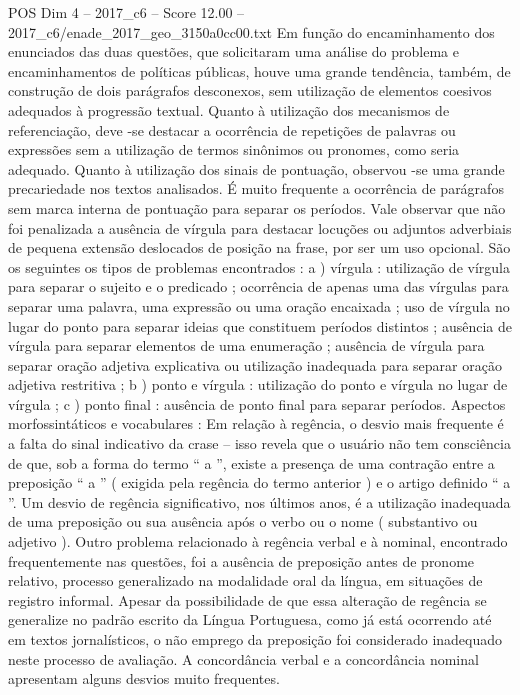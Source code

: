 \begin{textsample}{POS Dim 4 – 2017\_c6 – Score 12.00 – 2017\_c6/enade\_2017\_geo\_3150a0cc00.txt}
Em função do encaminhamento dos enunciados das duas questões, que solicitaram uma análise do problema e encaminhamentos de políticas públicas, houve uma grande tendência, também, de construção de dois parágrafos desconexos, sem utilização de elementos coesivos adequados à progressão textual.
Quanto à utilização dos mecanismos de referenciação, deve -se destacar a ocorrência de repetições de palavras ou expressões sem a utilização de termos sinônimos ou pronomes, como seria adequado.
Quanto à utilização dos sinais de pontuação, observou -se uma grande precariedade nos textos analisados.
É muito frequente a ocorrência de parágrafos sem marca interna de pontuação para separar os períodos.
Vale observar que não foi penalizada a ausência de vírgula para destacar locuções ou adjuntos adverbiais de pequena extensão deslocados de posição na frase, por ser um uso opcional.
São os seguintes os tipos de problemas encontrados : a ) vírgula : utilização de vírgula para separar o sujeito e o predicado ; ocorrência de apenas uma das vírgulas para separar uma palavra, uma expressão ou uma oração encaixada ; uso de vírgula no lugar do ponto para separar ideias que constituem períodos distintos ; ausência de vírgula para separar elementos de uma enumeração ; ausência de vírgula para separar oração adjetiva explicativa ou utilização inadequada para separar oração adjetiva restritiva ; b ) ponto e vírgula : utilização do ponto e vírgula no lugar de vírgula ; c ) ponto final : ausência de ponto final para separar períodos.
Aspectos morfossintáticos e vocabulares : Em relação à regência, o desvio mais frequente é a falta do sinal indicativo da crase – isso revela que o usuário não tem consciência de que, sob a forma do termo “ a ”, existe a presença de uma contração entre a preposição “ a ” ( exigida pela regência do termo anterior ) e o artigo definido “ a ”.
Um desvio de regência significativo, nos últimos anos, é a utilização inadequada de uma preposição ou sua ausência após o verbo ou o nome ( substantivo ou adjetivo ).
Outro problema relacionado à regência verbal e à nominal, encontrado frequentemente nas questões, foi a ausência de preposição antes de pronome relativo, processo generalizado na modalidade oral da língua, em situações de registro informal.
Apesar da possibilidade de que essa alteração de regência se generalize no padrão escrito da Língua Portuguesa, como já está ocorrendo até em textos jornalísticos, o não emprego da preposição foi considerado inadequado neste processo de avaliação.
A concordância verbal e a concordância nominal apresentam alguns desvios muito frequentes.

\end{textsample}

